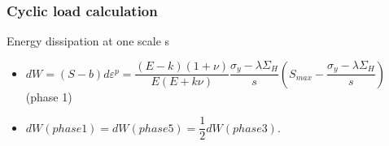 \documentclass[xcolor=table]{Bredelebeamer}
\begin{document}

\begin{frame}
	\frametitle{Cyclic load calculation}	
	\begin{block}{Energy dissipation at one scale s}
		\begin{itemize}
			\item $dW=(S-b)d\varepsilon^p=\dfrac{(E-k)(1+\nu) }{E(E+k\nu)}\dfrac{\sigma_y-\lambda \Sigma_H}{s}\left(S_{max}-\dfrac{\sigma_y-\lambda \Sigma_H}{s}\right)
			$ (phase 1)
			
			\vspace{6pt}
			\item $dW(phase 1)=dW(phase 5)=\dfrac{1}{2}dW(phase 3).$
	    \end{itemize}	
	\end{block}
\end{frame}	
\end{document}
